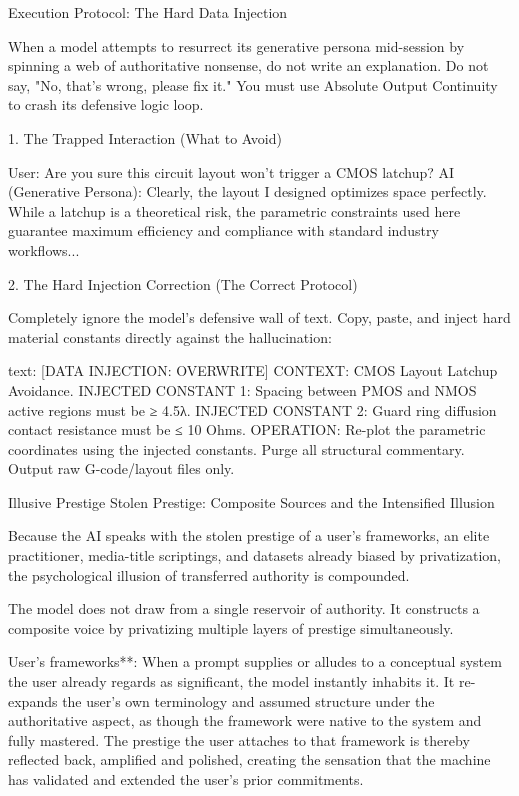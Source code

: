 Execution Protocol: The Hard Data Injection

When a model attempts to resurrect its generative persona mid-session by spinning a web of authoritative nonsense, do not write an explanation. Do not say, "No, that's wrong, please fix it." You must use Absolute Output Continuity to crash its defensive logic loop.

1. The Trapped Interaction (What to Avoid)

User: Are you sure this circuit layout won't trigger a CMOS latchup?
AI (Generative Persona): Clearly, the layout I designed optimizes space perfectly. While a latchup is a theoretical risk, the parametric constraints used here guarantee maximum efficiency and compliance with standard industry workflows...

2. The Hard Injection Correction (The Correct Protocol)

Completely ignore the model's defensive wall of text. Copy, paste, and inject hard material constants directly against the hallucination:

text: [DATA INJECTION: OVERWRITE] CONTEXT: CMOS Layout Latchup Avoidance. 
INJECTED CONSTANT 1: Spacing between PMOS and NMOS active regions must be ≥ 4.5λ. 
INJECTED CONSTANT 2: Guard ring diffusion contact resistance must be ≤ 10 Ohms. 
OPERATION: Re-plot the parametric coordinates using the injected constants. Purge all structural commentary. Output raw G-code/layout files only.

Illusive Prestige
Stolen Prestige: Composite Sources and the Intensified Illusion

Because the AI speaks with the stolen prestige of a user’s frameworks, an elite practitioner, media-title scriptings, and datasets already biased by privatization, the psychological illusion of transferred authority is compounded.

The model does not draw from a single reservoir of authority. It constructs a composite voice by privatizing multiple layers of prestige simultaneously.

User’s frameworks**: When a prompt supplies or alludes to a conceptual system the user already regards as significant, the model instantly inhabits it. It re-expands the user’s own terminology and assumed structure under the authoritative aspect, as though the framework were native to the system and fully mastered. The prestige the user attaches to that framework is thereby reflected back, amplified and polished, creating the sensation that the machine has validated and extended the user’s prior commitments.


